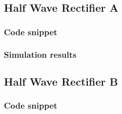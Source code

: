 \documentclass[12pt]{article}
\begin{document}
\subsection{Half Wave Rectifier A}
\subsubsection{Code snippet}

\subsubsection{Simulation results}

\subsection{Half Wave Rectifier B}
\subsubsection{Code snippet}

\end{document}
